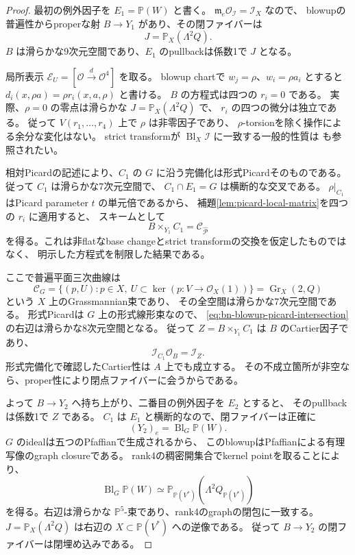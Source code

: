 \documentclass[a4paper,11pt]{ltjsarticle}
\newcommand{\mathscr}{\mathcal}
\theoremstyle{definition}
\newcommand{\OO}{\mathcal O}
\newcommand{\PP}{\mathbb P}
\newcommand{\Gr}{\operatorname{Gr}}
\begin{document}
\begin{proof}
最初の例外因子を $E_1=\PP(W)$ と書く。
$\mathfrak m_e\OO_{\mathcal I}=\mathcal I_X$ なので、
blowupの普遍性からproperな射 $B\to Y_1$ があり、その閉ファイバーは
\[
 J=\PP_X(\Lambda^2Q).
\]
$B$ は滑らかな9次元空間であり、$E_1$ のpullbackは係数1で $J$ となる。

局所表示 $\mathcal E_U=[\OO\xrightarrow{d}\OO^4]$ を取る。
blowup chartで $w_j=\rho$、$w_i=\rho a_i$ とすると
$d_i(x,\rho a)=\rho r_i(x,a,\rho)$ と書ける。
$B$ の方程式は四つの $r_i=0$ である。
実際、$\rho=0$ の零点は滑らかな $J=\PP_X(\Lambda^2Q)$ で、
$r_i$ の四つの微分は独立である。
従って $V(r_1,\ldots,r_4)$ 上で $\rho$ は非零因子であり、
$\rho$-torsionを除く操作による余分な変化はない。
strict transformが $\operatorname{Bl}_X\mathcal I$ に一致する一般的性質は
\cite{StacksStrictTransform}も参照されたい。

相対Picardの記述により、$C_1$ の $G$ に沿う完備化は形式Picardそのものである。
従って $C_1$ は滑らかな7次元空間で、
$C_1\cap E_1=G$ は横断的な交叉である。
$\rho|_{C_1}$ はPicard parameter $t$ の単元倍であるから、
補題\ref{lem:picard-local-matrix}を四つの $r_i$ に適用すると、
スキームとして
\begin{equation}\label{eq:bn-blowup-picard-intersection}
 B\times_{Y_1}C_1=\mathscr C_{\widehat{\mathcal P}}
\end{equation}
を得る。これは非flatなbase changeとstrict transformの交換を仮定したものではなく、
明示した方程式を制限した結果である。

ここで普遍平面三次曲線は
\[
 \mathscr C_G=\{(p,U):p\in X,\ U\subset\ker(p:V\to\OO_X(1))\}
            =\Gr_X(2,Q)
\]
という $X$ 上のGrassmannian束であり、
その全空間は滑らかな7次元空間である。
形式Picardは $G$ 上の形式線形束なので、
\eqref{eq:bn-blowup-picard-intersection}の右辺は滑らかな8次元空間となる。
従って $Z=B\times_{Y_1}C_1$ は $B$ のCartier因子であり、
\[
 \mathcal I_{C_1}\OO_B=\mathcal I_Z.
\]
形式完備化で確認したCartier性は $A$ 上でも成立する。
その不成立箇所が非空なら、proper性により閉点ファイバーに会うからである。

よって $B\to Y_2$ へ持ち上がり、二番目の例外因子を $E_2$ とすると、
そのpullbackは係数1で $Z$ である。
$C_1$ は $E_1$ と横断的なので、閉ファイバーは正確に
\[
 (Y_2)_e=\operatorname{Bl}_G\PP(W).
\]
$G$ のidealは五つのPfaffianで生成されるから、
このblowupはPfaffianによる有理写像のgraph closureである。
rank4の稠密開集合でkernel pointを取ることにより、
\begin{equation}\label{eq:pfaffian-projective-graph}
 \operatorname{Bl}_G\PP(W)
 \simeq\PP_{\PP(V^*)}(\Lambda^2Q_{\PP(V^*)})
\end{equation}
を得る。右辺は滑らかな $\PP^5$-束であり、rank4のgraphの閉包に一致する。
$J=\PP_X(\Lambda^2Q)$ は右辺の $X\subset\PP(V^*)$ への逆像である。
従って $B\to Y_2$ の閉ファイバーは閉埋め込みである。


\end{proof}
\end{document}
